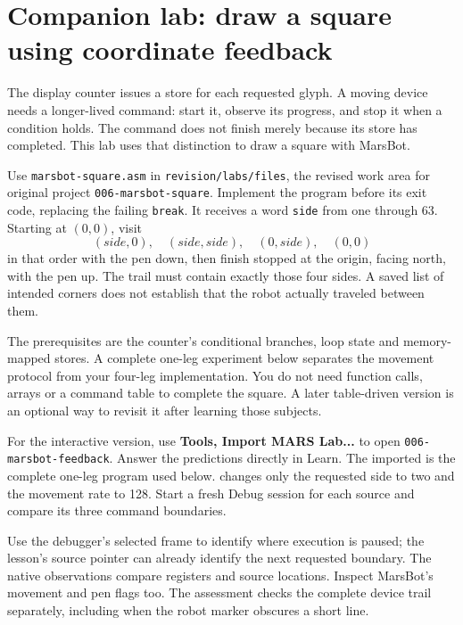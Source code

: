 \section{Companion lab: draw a square using coordinate feedback}
\label{revision-lab:marsbot}

The display counter issues a store for each requested glyph. A moving device
needs a longer-lived command: start it, observe its progress, and stop it when a
condition holds. The command does not finish merely because its store has
completed. This lab uses that distinction to draw a square with MarsBot.

\begin{samepage}
  Use \texttt{marsbot-square.asm} in \texttt{revision/labs/files}, the revised work
  area for original project \texttt{006-marsbot-square}. Implement the program
  before its exit code, replacing the failing \texttt{break}. It receives a word
  \texttt{side} from one through 63. Starting at $(0,0)$, visit
  \[
    (side,0),\quad(side,side),\quad(0,side),\quad(0,0)
  \]
  in that order with the pen down, then finish stopped at the origin, facing north,
  with the pen up. The trail must contain exactly those four sides. A saved list of
  intended corners does not establish that the robot actually traveled between them.\par
\end{samepage}

The prerequisites are the counter's conditional branches, loop state and
memory-mapped stores. A complete one-leg experiment below separates the movement
protocol from your four-leg implementation. You do not need function calls,
arrays or a command table to complete the square. A later table-driven version
is an optional way to revisit it after learning those subjects.

For the interactive version, use \textbf{Tools, Import MARS Lab...} to open
\texttt{006-marsbot-feedback}. Answer the predictions directly in Learn. The
imported  is the complete one-leg program used below.
 changes only the requested side to two and the
movement rate to 128. Start a fresh Debug session for each source and compare
its three command boundaries.

Use the debugger's selected frame to identify where execution is paused; the
lesson's source pointer can already identify the next requested boundary.
The native observations compare registers and source locations. Inspect MarsBot's
movement and pen flags too. The assessment checks the complete device trail
separately, including when the robot marker obscures a short line.

